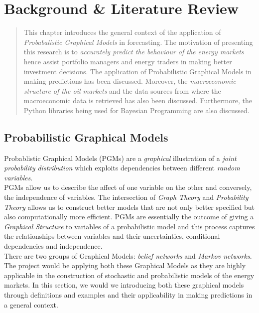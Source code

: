 \chapter{Background \& Literature Review}
\label{chap2}
\label{background}

\begin{quote}
This chapter introduces the general context of the application of \emph{Probabalistic Graphical Models} in forecasting. The motivation of presenting this research is to \emph{accurately predict the behaviour of the energy markets} hence assist portfolio managers and energy traders in making better investment decisions. The application of  Probabilistic Graphical Models in making predictions has been discussed. Moreover, the \emph{macroeconomic structure of the oil markets} and the data sources from where the macroeconomic data is retrieved has also been discussed. Furthermore, the Python libraries being used for Bayesian Programming are also discussed.
\end{quote}


\section{Probabilistic Graphical Models}

Probablistic Graphical Models (PGMs) are a \emph{graphical} illustration of a \emph{joint probability distribution} which exploits dependencies between different \emph{random variables}. \\

PGMs allow us to describe the affect of one variable on the other and conversely, the independence of variables. The intersection of \emph{Graph Theory} and \emph{Probability Theory} allows us to construct better models that are not only better specified but also computationally more efficient. PGMs are essentially the outcome of giving a \emph{Graphical Structure} to variables of a probabilistic model and this process captures the relationships between variables and their uncertainties, conditional dependencies and independence.\\

There are two groups of Graphical Models: \emph{belief networks} and \emph{Markov networks}. The project would be applying both these Graphical Models as they are highly applicable in the construction of stochastic and probabilistic models of the energy markets. In this section, we would we introducing both these graphical models through definitions and examples and their applicability in making predictions in a general context. \\

